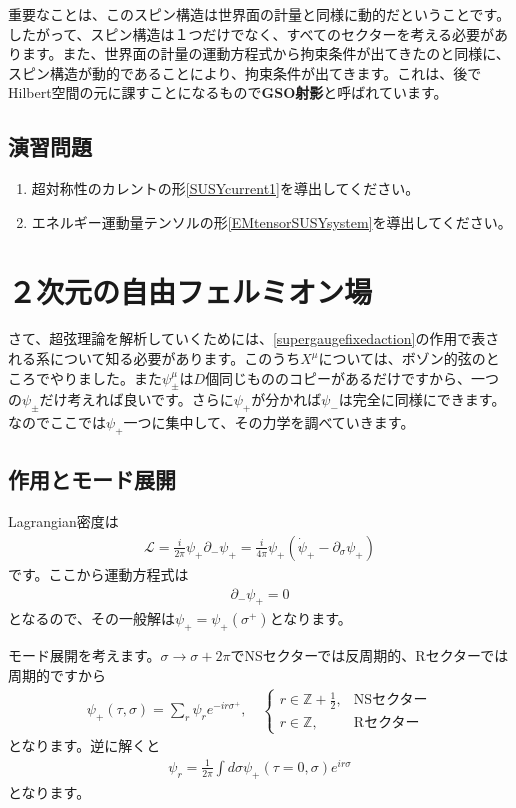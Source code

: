 \documentclass[report,paper=a4, fontsize=12pt, line_length=16cm, number_of_lines=33,dvipdfmx]{jlreq}
\numberwithin{equation}{chapter}
\numberwithin{equation}{section}
\newcommand{\Zb}{\mathbb{Z}}
\newcommand{\del}{\partial}
\newcommand{\kyou}[1]{{\sffamily \bfseries #1}}
\newcommand{\Lcal}{\mathcal{L}}
\begin{document}
重要なことは、このスピン構造は世界面の計量と同様に動的だということです。したがって、スピン構造は１つだけでなく、すべてのセクターを考える必要があります。また、世界面の計量の運動方程式から拘束条件が出てきたのと同様に、スピン構造が動的であることにより、拘束条件が出てきます。これは、後でHilbert空間の元に課すことになるもので\kyou{GSO射影}と呼ばれています。

\subsection*{演習問題}
\begin{enumerate}
  \item 超対称性のカレントの形\eqref{SUSYcurrent1}を導出してください。
  \item エネルギー運動量テンソルの形\eqref{EMtensorSUSYsystem}を導出してください。
\end{enumerate}

\section{２次元の自由フェルミオン場}
さて、超弦理論を解析していくためには、\eqref{supergaugefixedaction}の作用で表される系について知る必要があります。このうち$X^{\mu}$については、ボゾン的弦のところでやりました。また$\psi^{\mu}_{\pm}$は$D$個同じもののコピーがあるだけですから、一つの$\psi_{\pm}$だけ考えれば良いです。さらに$\psi_{+}$が分かれば$\psi_{-}$は完全に同様にできます。なのでここでは$\psi_{+}$一つに集中して、その力学を調べていきます。

\subsection{作用とモード展開}
Lagrangian密度は
\begin{align}
  \Lcal=\frac{i}{2\pi}\psi_{+}\del_{-}\psi_{+}=\frac{i}{4\pi}\psi_{+}(\dot{\psi}_{+}-\del_{\sigma}\psi_{+})\label{MWfermionaction}
\end{align}
です。ここから運動方程式は
\begin{align}
  \del_{-}\psi_{+}=0
\end{align}
となるので、その一般解は$\psi_{+}=\psi_{+}(\sigma^{+})$となります。

モード展開を考えます。$\sigma\to\sigma+2\pi$でNSセクターでは反周期的、Rセクターでは周期的ですから
\begin{align}
  \psi_{+}(\tau,\sigma)=\sum_{r} \psi_{r} e^{-ir\sigma^{+}},\quad
  \begin{cases}
    r\in \Zb+\frac12,&\text{NSセクター}\\
    r\in \Zb,&\text{Rセクター}
  \end{cases}
  \label{psimodeexp}
\end{align}
となります。逆に解くと
\begin{align}
  \psi_{r}=\frac{1}{2\pi}\int d\sigma \psi_{+}(\tau=0,\sigma)e^{ir\sigma}
\end{align}
となります。
\end{document}
